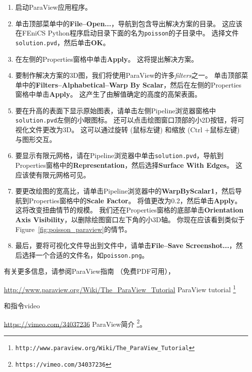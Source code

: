 \begin{enumerate}
\item 启动ParaView应用程序。

\item 单击顶部菜单中的\textbf{File--Open...}，导航到包含导出解决方案的目录。 这应该在FEniCS Python程序启动目录下面的名为\texttt{poisson}的子目录中。 选择文件\texttt{solution.pvd}，然后单击\textbf{OK}。

\item 在左侧的Properties窗格中单击\textbf{Apply}。 这将提出解决方案。

\item 要制作解决方案的3D图，我们将使用ParaView的许多\emph{filters}之一。 单击顶部菜单中的\textbf{Filters--Alphabetical--Warp By Scalar}，然后在左侧的Properties窗格中单击\textbf{Apply}。 这产生了由解值确定的高度的高架表面。

\item 要在升高的表面下显示原始图表，请单击左侧Pipeline浏览器窗格中\texttt{solution.pvd}左侧的小眼图标。 还可以点击绘图窗口顶部的小2D按钮，将可视化文件更改为3D。 这可以通过旋转 (鼠标左键) 和缩放 (Ctrl +鼠标左键) 与图形交互。

\item 要显示有限元网格，请在Pipeline浏览器中单击\texttt{solution.pvd}，导航到Properties窗格中的\textbf{Representation}，然后选择\textbf{Surface With Edges}。 这应该使有限元网格可见。

\item 要更改绘图的宽高比，请单击Pipeline浏览器中的\textbf{WarpByScalar1}，然后导航到Properties窗格中的\textbf{Scale Factor}。 将值更改为0.2，然后单击\textbf{Apply}。 这将改变扭曲情节的规模。 我们还在Properties窗格的底部单击\textbf{Orientation Axis Visibility}，以删除绘图窗口左下角的小3D轴。 你现在应该看到类似于Figure~\ref{fig:poisson_paraview}的情节。

\item 最后，要将可视化文件导出到文件中，请单击\textbf{File--Save Screenshot...}，然后选择一个合适的文件名，如\texttt{poisson.png}。
\end{enumerate}

\noindent
有关更多信息，请参阅ParaView指南\cite{Paraview}
（免费PDF可用），
\begin{center}
  \url{http://www.paraview.org/Wiki/The_ParaView_Tutorial} {ParaView tutorial} \footnote{\texttt{http://www.paraview.org/Wiki/The\_ParaView\_Tutorial}}
\end{center}
  和指令video
\begin{center}
  \url{https://vimeo.com/34037236} {ParaView简介} \footnote{\texttt{https://vimeo.com/34037236}}。
\end{center}

